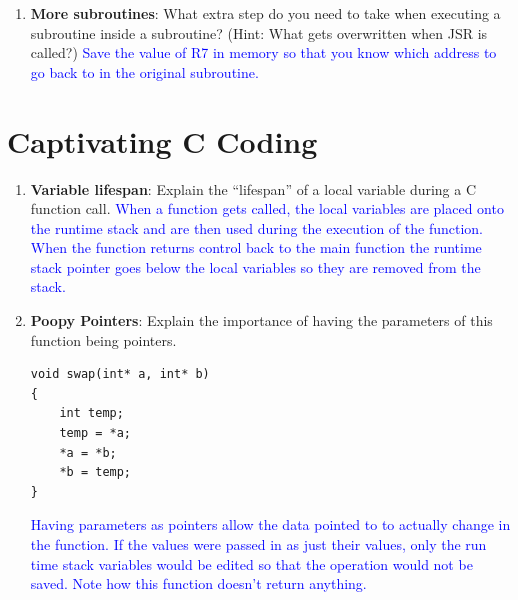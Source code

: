 \documentclass{article}
\begin{document}
\begin{enumerate}[label=(\alph*)]
    \item 
    \textbf{More subroutines}: What extra step do you need to take when executing a subroutine inside a subroutine? (Hint: What gets overwritten when JSR is called?)\newline
    \textcolor{blue}{ Save the value of R7 in memory so that you know which address to go back to in the original subroutine.}
    \end{enumerate}
    
\newpage
\section{Captivating C Coding}
\begin{enumerate}[label=(\alph*)]
    \item \textbf{Variable lifespan}: Explain the “lifespan” of a local variable during a C function call.
    \newline\textcolor{blue}{When a function gets called, the local variables are placed onto the runtime stack and are then used during the execution of the function. When the function returns control back to the main function the runtime stack pointer goes below the local variables so they are removed from the stack.
    }
    
    \item \textbf{Poopy Pointers}: Explain the importance of having the parameters of this function being pointers.
    
    \begin{lstlisting}[style=CStyle]
void swap(int* a, int* b)
{
    int temp;
    temp = *a;
    *a = *b;
    *b = temp;
} \end{lstlisting}

    \textcolor{blue}{Having parameters as pointers allow the data pointed to to actually change in the function. If the values were passed in as just their values, only the run time stack variables would be edited so that the operation would not be saved. Note how this function doesn't return anything.
    }
 

\end{enumerate}
\end{document}
